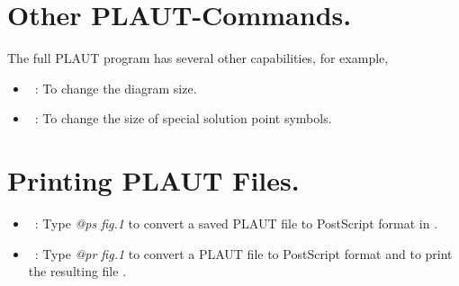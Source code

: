 \section{ Other {\cal PLAUT}-Commands.} \label{sec:Other_PLAUT_commands}
The full {\cal PLAUT} program has several other capabilities, for example,

\begin{itemize}
\item[\commandf{ scr}]~:  To change the diagram size.
\item[\commandf{ rss}]~:  To change the size of special solution point symbols.
\end{itemize}


\section{ Printing {\cal PLAUT} Files.} \label{sec:Printing_PLAUT_files}
\begin{itemize}
\item[\commandf{ @ps}]~:
  Type {\it @ps fig.1} to convert a saved {\cal PLAUT} file  
  to {\cal PostScript} format
  in .
\item[\commandf{ @pr}]~:
  Type {\it @pr fig.1} to convert a {\cal PLAUT} file  to 
  {\cal PostScript} format and to
  print the resulting file .
\end{itemize}

